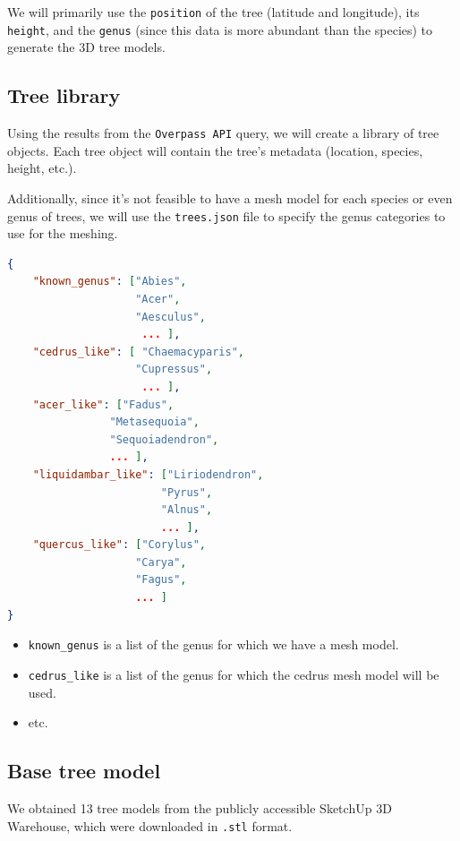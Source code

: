 \documentclass[12pt]{article}
\begin{document}
We will primarily use the \texttt{position} of the tree (latitude and
longitude), its \texttt{height}, and the \texttt{genus} (since this data is
more abundant than the species) to generate the 3D tree models.

\newpage

\subsection{Tree library}
Using the results from the \texttt{Overpass API} query, we will create a
library of tree objects. Each tree object will contain the tree's metadata
(location, species, height, etc.).

Additionally, since it's not feasible to have a mesh model for each species or
even genus of trees, we will use the \texttt{trees.json} file to specify the
genus categories to use for the meshing.

\begin{lstlisting}[language=json]
{
    "known_genus": ["Abies",
                    "Acer",
                    "Aesculus",
                     ... ],
    "cedrus_like": [ "Chaemacyparis",
                    "Cupressus",
                     ... ],
    "acer_like": ["Fadus",
                "Metasequoia",
                "Sequoiadendron",
                ... ],
    "liquidambar_like": ["Liriodendron",
                        "Pyrus",
                        "Alnus",
                        ... ],
    "quercus_like": ["Corylus",
                    "Carya",
                    "Fagus",
                    ... ]
}
\end{lstlisting}

\begin{itemize}
    \item \texttt{known\_genus} is a list of the genus for which we have a mesh model.
    \item \texttt{cedrus\_like} is a list of the genus for which the cedrus mesh model will be used.
    \item etc.
\end{itemize}

\newpage

\subsection{Base tree model}
We obtained 13 tree models from the publicly accessible SketchUp\cite{sketchup}
3D Warehouse, which were downloaded in \texttt{.stl} format.
\end{document}
